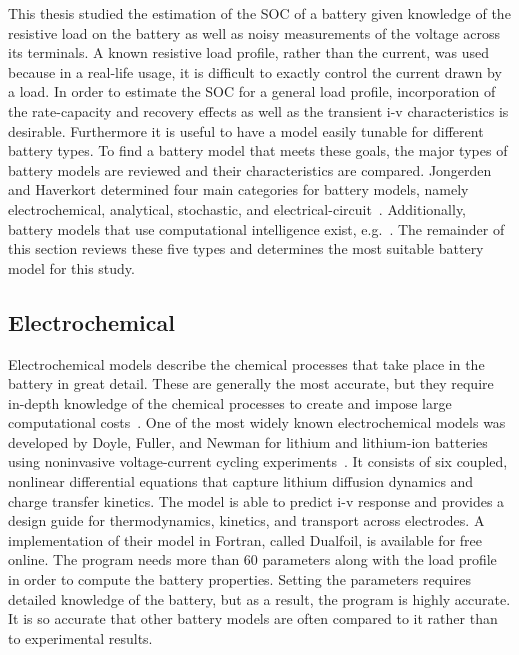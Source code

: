 \documentclass[../zhang_thesis.tex]{subfiles}
\begin{document}
This thesis studied the estimation of the SOC of a battery given knowledge of the resistive load on the battery as well as noisy measurements of the voltage across its terminals. A known resistive load profile, rather than the current, was used because in a real-life usage, it is difficult to exactly control the current drawn by a load. In order to estimate the SOC for a general load profile, incorporation of the rate-capacity and recovery effects as well as the transient i-v characteristics
is desirable. Furthermore it is useful to have a model easily tunable for different battery types. To find a battery model that meets these goals, the major types of battery models are reviewed and their characteristics are compared.
Jongerden and Haverkort determined four main categories for battery models, namely electrochemical, analytical, stochastic, and electrical-circuit~\cite{jongerden08}.
Additionally, battery models that use computational intelligence exist, e.g.~\cite{man12,ogorman98,capizzi11,wang06,shen02}.
The remainder of this section reviews these five types and determines the most suitable battery model for this study.

\subsection{Electrochemical}

Electrochemical models describe the chemical processes that take place in the battery in great detail. These are generally the most accurate, but they require in-depth knowledge of the chemical processes to create and impose large computational costs~\cite{jongerden09}. One of the most widely known electrochemical models was developed by Doyle, Fuller, and Newman for lithium and lithium-ion batteries using noninvasive voltage-current cycling
experiments~\cite{doyle93,fuller94,fuller94b}. It consists of six coupled, nonlinear differential equations that capture lithium diffusion dynamics and charge transfer kinetics. The model is able to predict i-v response and provides a design guide for thermodynamics, kinetics, and transport across electrodes. A implementation of their model in Fortran, called Dualfoil, is available for free online. The program needs more than 60 parameters along with the load profile
in order to compute the battery properties. Setting the parameters requires detailed knowledge of the battery, but as a result, the program is highly accurate. It is so accurate that other battery models are often compared to it rather than to experimental results.
\end{document}
